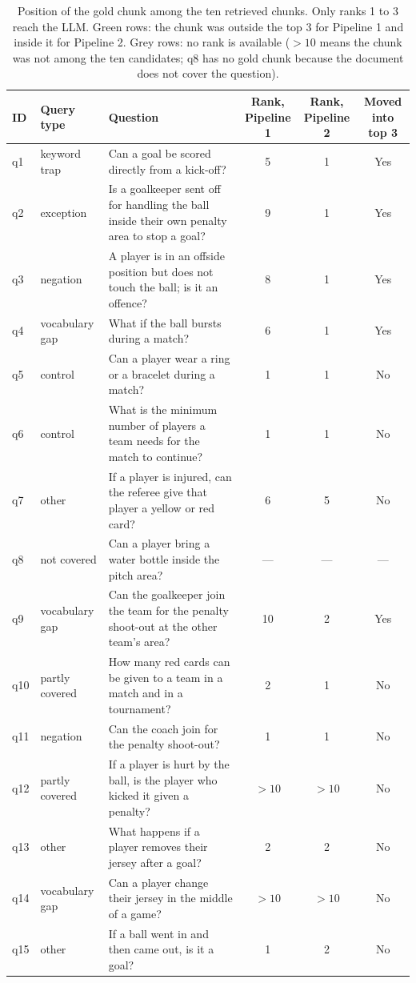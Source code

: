 \documentclass[11pt,a4paper]{article}
\begin{document}
\begin{table}[H]
\centering
\footnotesize
\renewcommand{\arraystretch}{1.15}
\begin{tabularx}{\textwidth}{@{}l l X c c c@{}}
\toprule
ID & Query type & Question & \shortstack{Rank,\\Pipeline 1} & \shortstack{Rank,\\Pipeline 2} & \shortstack{Moved into\\top 3} \\
\midrule
\rowcolor{green!12}q1 & keyword trap & Can a goal be scored directly from a kick-off? & 5 & 1 & Yes \\
\rowcolor{green!12}q2 & exception & Is a goalkeeper sent off for handling the ball inside their own penalty area to stop a goal? & 9 & 1 & Yes \\
\rowcolor{green!12}q3 & negation & A player is in an offside position but does not touch the ball; is it an offence? & 8 & 1 & Yes \\
\rowcolor{green!12}q4 & vocabulary gap & What if the ball bursts during a match? & 6 & 1 & Yes \\
q5 & control & Can a player wear a ring or a bracelet during a match? & 1 & 1 & No \\
q6 & control & What is the minimum number of players a team needs for the match to continue? & 1 & 1 & No \\
q7 & other & If a player is injured, can the referee give that player a yellow or red card? & 6 & 5 & No \\
\rowcolor{gray!15}q8 & not covered & Can a player bring a water bottle inside the pitch area? & --- & --- & --- \\
\rowcolor{green!12}q9 & vocabulary gap & Can the goalkeeper join the team for the penalty shoot-out at the other team's area? & 10 & 2 & Yes \\
q10 & partly covered & How many red cards can be given to a team in a match and in a tournament? & 2 & 1 & No \\
q11 & negation & Can the coach join for the penalty shoot-out? & 1 & 1 & No \\
\rowcolor{gray!15}q12 & partly covered & If a player is hurt by the ball, is the player who kicked it given a penalty? & $>10$ & $>10$ & No \\
q13 & other & What happens if a player removes their jersey after a goal? & 2 & 2 & No \\
\rowcolor{gray!15}q14 & vocabulary gap & Can a player change their jersey in the middle of a game? & $>10$ & $>10$ & No \\
q15 & other & If a ball went in and then came out, is it a goal? & 1 & 2 & No \\
\bottomrule
\end{tabularx}
\caption{Position of the gold chunk among the ten retrieved chunks. Only ranks 1 to 3 reach the LLM. Green rows: the chunk was outside the top 3 for Pipeline 1 and inside it for Pipeline 2. Grey rows: no rank is available ($>10$ means the chunk was not among the ten candidates; q8 has no gold chunk because the document does not cover the question).}
\label{tab:ranks}
\end{table}
\end{document}
